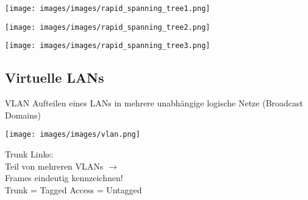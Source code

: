 \begin{example}
    \begin{minipage}{0.48\linewidth}
        \texttt{[image: images/images/rapid\_spanning\_tree1.png]}
    \end{minipage}
    \begin{minipage}{0.48\linewidth}
        \texttt{[image: images/images/rapid\_spanning\_tree2.png]}
    \end{minipage}
    \begin{center}
    \texttt{[image: images/images/rapid\_spanning\_tree3.png]}
    \end{center}
\end{example}

\columnbreak

\subsection{Virtuelle LANs}

\begin{definition}{VLAN}
    Aufteilen eines LANs in mehrere unabhängige logische Netze (Broadcast Domains)\\
    \begin{minipage}{0.65\linewidth}
        \texttt{[image: images/images/vlan.png]}
    \end{minipage}
    \begin{minipage}{0.3\linewidth}
        Trunk Links: \\
        Teil von mehreren VLANs $\rightarrow$ \\
        Frames eindeutig kennzeichnen!
        \vspace{1mm}\\
        Trunk = Tagged Access = Untagged
    \end{minipage}
\end{definition}

